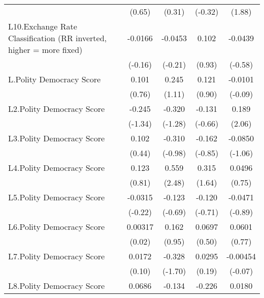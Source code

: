 {\begin{longtable}{l*{4}{c}}
                &   (0.65)         &   (0.31)         &  (-0.32)         &   (1.88)         \\
[1em]
L10.Exchange Rate Classification (RR inverted, higher = more fixed)&  -0.0166         &  -0.0453         &    0.102         &  -0.0439         \\
                &  (-0.16)         &  (-0.21)         &   (0.93)         &  (-0.58)         \\
[1em]
L.Polity Democracy Score&    0.101         &    0.245         &    0.121         &  -0.0101         \\
                &   (0.76)         &   (1.11)         &   (0.90)         &  (-0.09)         \\
[1em]
L2.Polity Democracy Score&   -0.245         &   -0.320         &   -0.131         &    0.189\sym{*}  \\
                &  (-1.34)         &  (-1.28)         &  (-0.66)         &   (2.06)         \\
[1em]
L3.Polity Democracy Score&    0.102         &   -0.310         &   -0.162         &  -0.0850         \\
                &   (0.44)         &  (-0.98)         &  (-0.85)         &  (-1.06)         \\
[1em]
L4.Polity Democracy Score&    0.123         &    0.559\sym{*}  &    0.315         &   0.0496         \\
                &   (0.81)         &   (2.48)         &   (1.64)         &   (0.75)         \\
[1em]
L5.Polity Democracy Score&  -0.0315         &   -0.123         &   -0.120         &  -0.0471         \\
                &  (-0.22)         &  (-0.69)         &  (-0.71)         &  (-0.89)         \\
[1em]
L6.Polity Democracy Score&  0.00317         &    0.162         &   0.0697         &   0.0601         \\
                &   (0.02)         &   (0.95)         &   (0.50)         &   (0.77)         \\
[1em]
L7.Polity Democracy Score&   0.0172         &   -0.328         &   0.0295         & -0.00454         \\
                &   (0.10)         &  (-1.70)         &   (0.19)         &  (-0.07)         \\
[1em]
L8.Polity Democracy Score&   0.0686         &   -0.134         &   -0.226         &   0.0180         \\

\end{longtable}}
